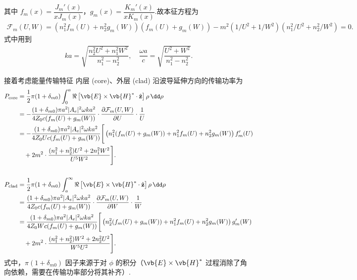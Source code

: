 其中 \( f_m(x) = \dfrac{J_m'(x)}{x J_m(x)} \)，\( g_m(x) = \dfrac{K_m'(x)}{x K_m(x)} \).故本征方程为
\begin{align*}
	\mathcal{F}_m(U, W) = \left( n_1^2 f_m(U) + n_2^2 g_m(W) \right) \left( f_m(U) + g_m(W) \right) - m^2 \left( 1/U^2 + 1/W^2 \right) \left( n_1^2/U^2 + n_2^2/W^2 \right) = 0.
\end{align*}
式中用到
\begin{align*}
	ka = \sqrt{\dfrac{n_2^2 U^2 + n_1^2 W^2}{n_1^2 - n_2^2}}, \quad \dfrac{\omega a}{c} = \sqrt{\dfrac{U^2 + W^2}{n_1^2 - n_2^2}}.
\end{align*}

接着考虑能量传输特征
内层 (core)、外层 (clad) 沿波导延伸方向的传输功率为
{\small
\begin{equation*}
	\begin{split}
		P_{\text{core}} & = \frac{1}{2} \pi (1 + \delta_{m0}) \int_0^a \Re\left[ \vb{E} \times \vb{H}^* \cdot \hat{\mathbf{z}} \right] \rho \, \dd \rho                          \\
		                & = -\frac{(1 + \delta_{m0}) \pi a^2 |A_e|^2 \omega k a^2}{4 Z_0 c (f_m(U) + g_m(W))} \cdot \frac{\partial \mathcal{F}_m(U, W)}{\partial U} \cdot \frac{1}{U}               \\
		                & = -\frac{(1 + \delta_{m0}) \pi a^2 |A_e|^2 \omega k a^2}{4 Z_0 U c (f_m(U) + g_m(W))} \Bigg[ \left( n_1^2 (f_m(U) + g_m(W)) + n_1^2 f_m(U) + n_2^2 g_m(W) \right) f_m'(U) \\
		                & \quad + 2 m^2 \cdot \frac{(n_1^2 + n_2^2) U^2 + 2 n_1^2 W^2}{U^5 W^2} \Bigg].                                                                                             \\
		\\
		P_{\text{clad}} & = \frac{1}{2} \pi (1 + \delta_{m0}) \int_a^\infty \Re\left[ \vb{E} \times \vb{H}^* \cdot \hat{\mathbf{z}} \right] \rho \, \dd \rho                     \\
		                & = \frac{(1 + \delta_{m0}) \pi a^2 |A_e|^2 \omega k a^2}{4 Z_0 c (f_m(U) + g_m(W))} \cdot \frac{\partial \mathcal{F}_m(U, W)}{\partial W} \cdot \frac{1}{W}                \\
		                & = \frac{(1 + \delta_{m0}) \pi a^2 |A_e|^2 \omega k a^2}{4 Z_0 W c (f_m(U) + g_m(W))} \Bigg[ \left( n_2^2 (f_m(U) + g_m(W)) + n_1^2 f_m(U) + n_2^2 g_m(W) \right)g_m'(W)   \\
		                & \quad + 2 m^2 \cdot \frac{(n_1^2 + n_2^2) W^2 + 2 n_2^2 U^2}{W^5 U^2} \Bigg].
	\end{split}
\end{equation*}
}
式中，\(\pi (1 + \delta_{m0})\) 因子来源于对 \(\phi\) 的积分（\(\vb{E} \times \vb{H}^*\) 过程消除了角向依赖，需要在传输功率部分将其补齐）.

